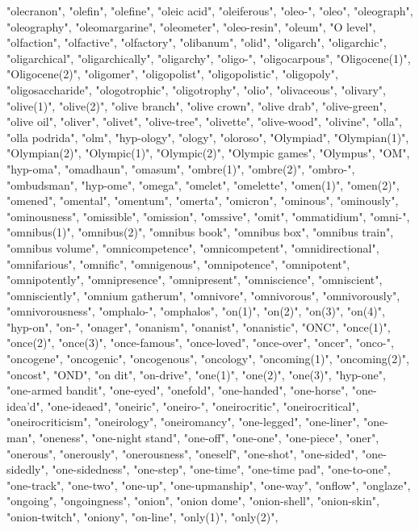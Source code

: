 "olecranon",
"olefin",
"olefine",
"oleic acid",
"oleiferous",
"oleo-",
"oleo",
"oleograph",
"oleography",
"oleomargarine",
"oleometer",
"oleo-resin",
"oleum",
"O level",
"olfaction",
"olfactive",
"olfactory",
"olibanum",
"olid",
"oligarch",
"oligarchic",
"oligarchical",
"oligarchically",
"oligarchy",
"oligo-",
"oligocarpous",
"Oligocene(1)",
"Oligocene(2)",
"oligomer",
"oligopolist",
"oligopolistic",
"oligopoly",
"oligosaccharide",
"ologotrophic",
"oligotrophy",
"olio",
"olivaceous",
"olivary",
"olive(1)",
"olive(2)",
"olive branch",
"olive crown",
"olive drab",
"olive-green",
"olive oil",
"oliver",
"olivet",
"olive-tree",
"olivette",
"olive-wood",
"olivine",
"olla",
"olla podrida",
"olm",
"hyp-ology",
"ology",
"oloroso",
"Olympiad",
"Olympian(1)",
"Olympian(2)",
"Olympic(1)",
"Olympic(2)",
"Olympic games",
"Olympus",
"OM",
"hyp-oma",
"omadhaun",
"omasum",
"ombre(1)",
"ombre(2)",
"ombro-",
"ombudsman",
"hyp-ome",
"omega",
"omelet",
"omelette",
"omen(1)",
"omen(2)",
"omened",
"omental",
"omentum",
"omerta",
"omicron",
"ominous",
"ominously",
"ominousness",
"omissible",
"omission",
"omssive",
"omit",
"ommatidium",
"omni-",
"omnibus(1)",
"omnibus(2)",
"omnibus book",
"omnibus box",
"omnibus train",
"omnibus volume",
"omnicompetence",
"omnicompetent",
"omnidirectional",
"omnifarious",
"omnific",
"omnigenous",
"omnipotence",
"omnipotent",
"omnipotently",
"omnipresence",
"omnipresent",
"omniscience",
"omniscient",
"omnisciently",
"omnium gatherum",
"omnivore",
"omnivorous",
"omnivorously",
"omnivorousness",
"omphalo-",
"omphalos",
"on(1)",
"on(2)",
"on(3)",
"on(4)",
"hyp-on",
"on-",
"onager",
"onanism",
"onanist",
"onanistic",
"ONC",
"once(1)",
"once(2)",
"once(3)",
"once-famous",
"once-loved",
"once-over",
"oncer",
"onco-",
"oncogene",
"oncogenic",
"oncogenous",
"oncology",
"oncoming(1)",
"oncoming(2)",
"oncost",
"OND",
"on dit",
"on-drive",
"one(1)",
"one(2)",
"one(3)",
"hyp-one",
"one-armed bandit",
"one-eyed",
"onefold",
"one-handed",
"one-horse",
"one-idea'd",
"one-ideaed",
"oneiric",
"oneiro-",
"oneirocritic",
"oneirocritical",
"oneirocriticism",
"oneirology",
"oneiromancy",
"one-legged",
"one-liner",
"one-man",
"oneness",
"one-night stand",
"one-off",
"one-one",
"one-piece",
"oner",
"onerous",
"onerously",
"onerousness",
"oneself",
"one-shot",
"one-sided",
"one-sidedly",
"one-sidedness",
"one-step",
"one-time",
"one-time pad",
"one-to-one",
"one-track",
"one-two",
"one-up",
"one-upmanship",
"one-way",
"onflow",
"onglaze",
"ongoing",
"ongoingness",
"onion",
"onion dome",
"onion-shell",
"onion-skin",
"onion-twitch",
"oniony",
"on-line",
"only(1)",
"only(2)",
